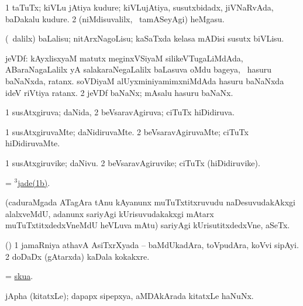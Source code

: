 \bentry
{}
\gl{\nA}
\bmng
\bnum
\num{1} taTuTx; kiVLu jAtiya kudure; kiVLujAtiya, susutxbidadx, jiVNaRvAda, baDakalu kudure. 
\num{2} (niMdisuvalilx, \sA\ tamASeyAgi) heMgasu. 
\enum
\emng
\eentry

\bentry
{}
\gl{\sakirx}
\bmng
(\kanmu\ \BUkaq dalilx) baLalisu; nitArxNagoLisu; kaSaTxda kelasa mADisi susutx biVLisu. 
\emng
\eentry

\bentry
{}
\gl{\nA}
\bmng
{} 
\bnum
{} jeVDf: 
\banum
{} kAyxlisxyaM matutx meginxVSiyaM silikeVTugaLiMdAda, ABaraNagaLalilx yA salakaraNegaLalilx baLasuva oMdu bageya, \sA\ hasuru baNaNxda, ratanx. 
\hypertarget{jade(3)1b}{} 
 soVDiyaM alUyxminiyamimxniMdAda hasuru baNaNxda ideV riVtiya ratanx. 
\eanum
\numie
\num{2} jeVDf baNaNx; mAsalu hasuru baNaNx. 
\enum
\emng
\eentry

\bentry
{}
\gl{\gu}
\bmng
\bnum
\num{1} susAtxgiruva; daNida, 
\num{2} beVsaravAgiruva; ciTuTx hiDidiruva. 
\enum
\emng
\eentry

\bentry
{}
\gl{\kirxvi}
\bmng
\bnum
\num{1} susAtxgiruvaMte; daNidiruvaMte. 
\num{2} beVsaravAgiruvaMte; ciTuTx hiDidiruvaMte. 
\enum
\emng
\eentry

\bentry
{}
\gl{\nA}
\bmng
\bnum
\num{1} susAtxgiruvike; daNivu. 
\num{2} beVsaravAgiruvike; ciTuTx (hiDidiruvike). 
\enum
\emng
\eentry

\bentry
{}
\gl{\nA}
\bmng
 = \hyperlink{jade(3)1b}{$^3$jade(1b)}. 
\emng
\eentry

\bentry
{}
\gl{\BAavayx}
\expl{\F}
\bmng
(caduraMgada ATagAra tAnu kAyanunx muTuTxtitxruvudu naDesuvudakAkxgi alalxveMdU, adanunx sariyAgi kUrisuvudakakxgi mAtarx muTuTxtitxdedxVneMdU heVLuva mAtu) sariyAgi kUrisutitxdedxVne, aSeTx. 
\emng
\eentry

\bentry
{}
\gl{\nA}
\bmng
(\ame) 
\bnum
\num{1} jamaRniya athavA AsiTxrXyada -- baMdUkadAra, toVpudAra, koVvi sipAyi. 
\num{2} doDaDx (gAtarxda) kaDala kokakxre. 
\enum
\emng
\eentry

\bentry
{}
\gl{\nA}
\bmng
= \hyperref{kandict_s.pdf}{S}{skua}{skua}. 
\emng
\eentry

\bentry
{}
\gl{\nA}
\bmng
jApha (kitatxLe); dapapx sipepxya, aMDAkArada kitatxLe haNuNx. 
\emng
\eentry

